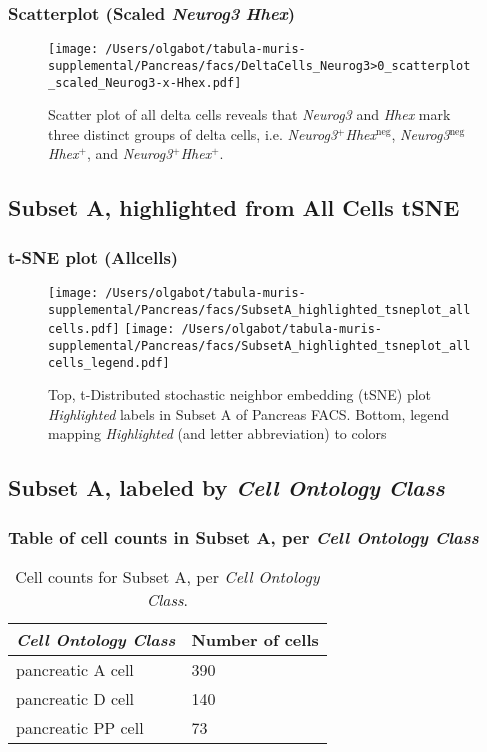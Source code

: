 \subsubsection{Scatterplot (Scaled \emph{Neurog3} \texttimes \emph{Hhex})}
\begin{figure}[h]
\centering
\texttt{[image: /Users/olgabot/tabula-muris-supplemental/Pancreas/facs/DeltaCells\_Neurog3>0\_scatterplot\_scaled\_Neurog3-x-Hhex.pdf]}

\caption{Scatter plot of all delta cells reveals that \emph{Neurog3} and \emph{Hhex} mark three distinct groups of
delta cells, i.e. \emph{Neurog3}$^+$\emph{Hhex}$^\text{neg}$, \emph{Neurog3}$^\text{neg}$\emph{Hhex}$^+$, and \emph{Neurog3}$^+$\emph{Hhex}$^+$.
}
\end{figure}


\clearpage

\subsection{Subset A, highlighted from All Cells tSNE}

\subsubsection{t-SNE plot (Allcells)}
\begin{figure}[h]
\centering
\texttt{[image: /Users/olgabot/tabula-muris-supplemental/Pancreas/facs/SubsetA\_highlighted\_tsneplot\_allcells.pdf]}
\texttt{[image: /Users/olgabot/tabula-muris-supplemental/Pancreas/facs/SubsetA\_highlighted\_tsneplot\_allcells\_legend.pdf]}
\caption{Top, t-Distributed stochastic neighbor embedding (tSNE) plot  \emph{Highlighted} labels in Subset A of Pancreas FACS. Bottom, legend mapping \emph{Highlighted} (and letter abbreviation) to colors}
\end{figure}


\clearpage

\subsection{Subset A, labeled by \emph{Cell Ontology Class}}
\subsubsection{Table of cell counts in Subset A, per \emph{Cell Ontology Class}}\begin{table}[h]
\centering
\label{my-label}
\begin{tabular}{@{}ll@{}}
\toprule

\emph{Cell Ontology Class}& Number of cells \\ \midrule
pancreatic A cell & 390 \\

pancreatic D cell & 140 \\

pancreatic PP cell & 73 \\
\bottomrule
\end{tabular}
\caption{Cell counts for Subset A, per \emph{Cell Ontology Class}.}
\end{table}

